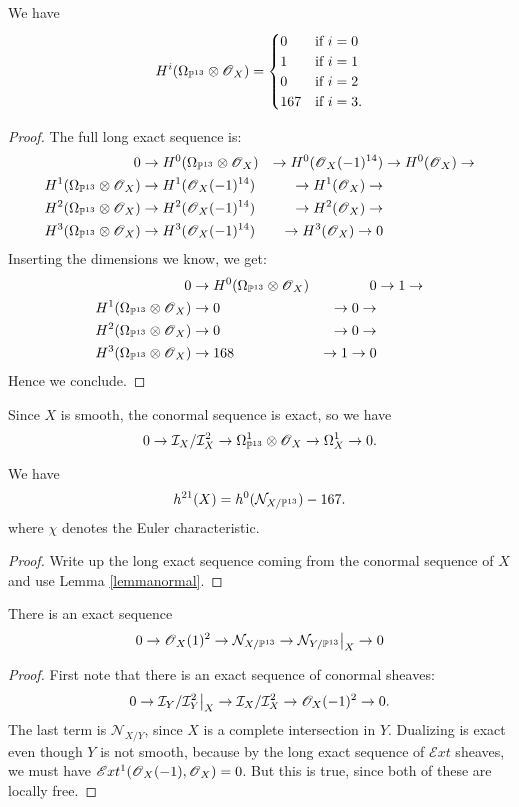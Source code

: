 \documentclass[11pt, english]{article}
\begin{document}
\begin{lemma}
We have
\[
H^i(\Omega_{\mathbb{P}^{13}} \otimes \operatorname{\mathscr{O}}_X) = \begin{cases}
0 & \text{if } i=0 \\
1 & \text{if } i=1 \\
0 & \text{if } i=2 \\
167 & \text{if } i=3. \\
\end{cases}
\]
\end{lemma}
\begin{proof}
The full long exact sequence is:
\begin{align*}
0 & \to H^0(\Omega_{\mathbb{P}^{13}} \otimes \operatorname{\mathscr{O}}_X) &\to H^0(\operatorname{\mathscr{O}}_X(-1)^{14}) &\to H^0(\operatorname{\mathscr{O}}_X) \to \\
H^1(\Omega_{\mathbb{P}^{13}} \otimes \operatorname{\mathscr{O}}_X) &\to H^1(\operatorname{\mathscr{O}}_X(-1)^{14}) &\to H^1(\operatorname{\mathscr{O}}_X) \to \\
 H^2(\Omega_{\mathbb{P}^{13}} \otimes \operatorname{\mathscr{O}}_X) &\to H^2(\operatorname{\mathscr{O}}_X(-1)^{14}) &\to H^2(\operatorname{\mathscr{O}}_X) \to \\
 H^3(\Omega_{\mathbb{P}^{13}} \otimes \operatorname{\mathscr{O}}_X) &\to H^3(\operatorname{\mathscr{O}}_X(-1)^{14}) &\to H^3(\operatorname{\mathscr{O}}_X) \to 0
\end{align*}
Inserting the dimensions we know, we get:
\begin{align*}
0 & \to H^0(\Omega_{\mathbb{P}^{13}} \otimes \operatorname{\mathscr{O}}_X) & 0  &\to 1 \to \\
H^1(\Omega_{\mathbb{P}^{13}} \otimes \operatorname{\mathscr{O}}_X) &\to 0 &\to 0 \to \\
 H^2(\Omega_{\mathbb{P}^{13}} \otimes \operatorname{\mathscr{O}}_X) &\to 0 &\to 0 \to \\
 H^3(\Omega_{\mathbb{P}^{13}} \otimes \operatorname{\mathscr{O}}_X) &\to 168  &\to 1 \to 0
\end{align*}
Hence we conclude.
\end{proof}

Since $X$ is smooth, the conormal sequence is exact, so we have
\[
0 \to \mathcal I_X/\mathcal I_X^2 \to \Omega^1_{\mathbb{P}^{13}} \otimes \operatorname{\mathscr{O}}_X \to \Omega_X^1 \to 0.
\]

\begin{lemma}
\label{lemmah21}
We have
\[
h^{21}(X) = h^0(\mathcal N_{X/\mathbb{P}^{13}})-167.
\]
where $\chi$ denotes the Euler characteristic.
\end{lemma}
\begin{proof}
Write up the long exact sequence coming from the conormal sequence of $X$ and use Lemma \ref{lemmanormal}.
\end{proof}

\begin{lemma}
There is an exact sequence
\[
0 \to \OO_X(1)^2 \to \mathcal N_{X/\PP^{13}} \to \restr{\mathcal N_{Y/\PP^{13}} }{X} \to 0
\]
\end{lemma}
\begin{proof}
First note that there is an exact sequence of conormal sheaves:
\[
0 \to \restr{ \mathcal I_Y /\mathcal I_Y^2 }{X} \to \mathcal I_X/\mathcal I_X^2 \to \mathscr O_X(-1)^2 \to 0.
\]
The last term is $\mathcal N_{X/Y}$, since $X$ is a complete intersection in $Y$. Dualizing is exact even though $Y$ is not smooth, because by the long exact sequence of $\mathscr {E}xt$ sheaves, we must have $\mathscr{E}xt^1(\operatorname{\mathscr{O}}_X(-1),\operatorname{\mathscr{O}}_X)=0$. But this is true, since both of these are locally free.
\end{proof}
\end{document}
